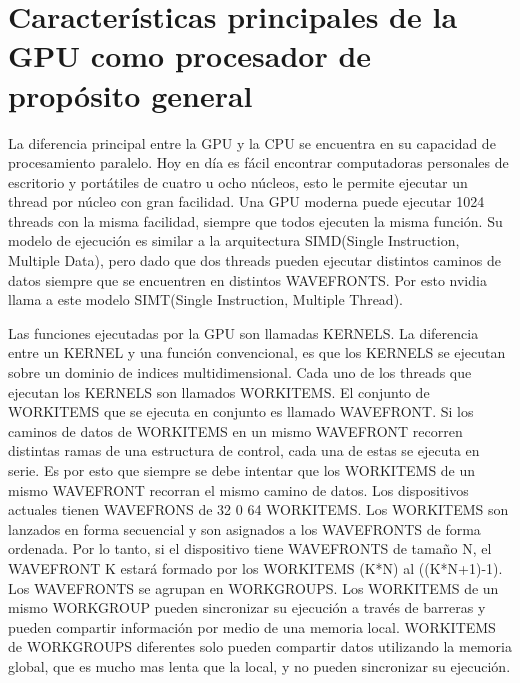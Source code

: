 
\chapter{Características principales de la GPU como procesador de propósito
general}

La diferencia principal entre la GPU y la CPU se encuentra en su capacidad de
procesamiento paralelo. Hoy en día es fácil encontrar computadoras personales de
escritorio y portátiles de cuatro u ocho núcleos, esto le permite ejecutar un
thread por núcleo con gran facilidad. Una GPU moderna puede ejecutar 1024
threads con la misma facilidad, siempre que todos ejecuten la misma función. Su
modelo de ejecución es similar a la arquitectura SIMD(Single Instruction,
Multiple Data), pero dado que dos threads pueden ejecutar distintos caminos de
datos siempre que se encuentren en distintos WAVEFRONTS. Por esto nvidia llama a
este modelo SIMT(Single Instruction, Multiple Thread).

Las funciones ejecutadas por la GPU son llamadas KERNELS. La diferencia entre un
KERNEL y una función convencional, es que los KERNELS se ejecutan sobre un
dominio de indices multidimensional. Cada uno de los threads que ejecutan los
KERNELS son llamados WORKITEMS. El conjunto de WORKITEMS que se ejecuta en
conjunto es llamado WAVEFRONT. Si los caminos de datos de WORKITEMS en un mismo
WAVEFRONT recorren distintas ramas de una estructura de control, cada una de
estas se ejecuta en serie. Es por esto que siempre se debe intentar que los
WORKITEMS de un mismo WAVEFRONT recorran el mismo camino de datos. Los
dispositivos actuales tienen WAVEFRONS de 32 0 64 WORKITEMS. Los WORKITEMS son
lanzados en forma secuencial y son asignados a los WAVEFRONTS de forma ordenada.
Por lo tanto, si el dispositivo tiene WAVEFRONTS de tamaño N, el WAVEFRONT K
estará formado por los WORKITEMS (K*N) al ((K*N+1)-1). Los WAVEFRONTS se agrupan
en WORKGROUPS. Los WORKITEMS de un mismo WORKGROUP pueden sincronizar su
ejecución a través de barreras y pueden compartir información por medio de una
memoria local. WORKITEMS de WORKGROUPS diferentes solo pueden compartir datos
utilizando la memoria global, que es mucho mas lenta que la local, y no pueden
sincronizar su ejecución.

